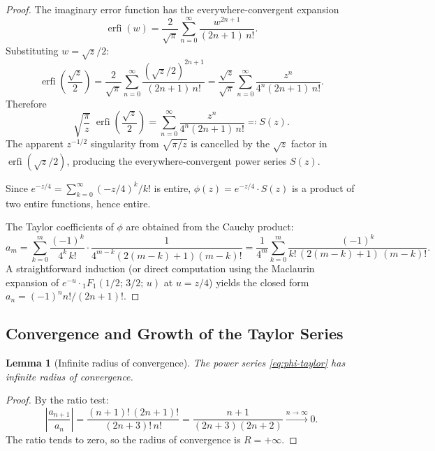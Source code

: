 \documentclass[11pt,a4paper]{article}
\newcommand{\erfi}{\operatorname{erfi}}
\theoremstyle{plain}
\newtheorem{lemma}[theorem]{Lemma}
\theoremstyle{definition}
\begin{document}
\begin{proof}
The imaginary error function has the everywhere-convergent expansion
\begin{equation}\label{eq:erfi-series}
  \erfi(w) = \frac{2}{\sqrt{\pi}}\sum_{n=0}^{\infty}
  \frac{w^{2n+1}}{(2n+1)\,n!}.
\end{equation}
Substituting $w = \sqrt{z}/2$:
\begin{equation}
  \erfi\!\left(\frac{\sqrt{z}}{2}\right)
  = \frac{2}{\sqrt{\pi}}\sum_{n=0}^{\infty}
  \frac{(\sqrt{z}/2)^{2n+1}}{(2n+1)\,n!}
  = \frac{\sqrt{z}}{\sqrt{\pi}}\sum_{n=0}^{\infty}
  \frac{z^n}{4^n(2n+1)\,n!}.
\end{equation}
Therefore
\begin{equation}\label{eq:sqrt-cancel}
  \sqrt{\frac{\pi}{z}}\;\erfi\!\left(\frac{\sqrt{z}}{2}\right)
  = \sum_{n=0}^{\infty} \frac{z^n}{4^n(2n+1)\,n!}
  \eqqcolon S(z).
\end{equation}
The apparent $z^{-1/2}$ singularity from $\sqrt{\pi/z}$ is cancelled
by the $\sqrt{z}$ factor in $\erfi(\sqrt{z}/2)$, producing the
everywhere-convergent power series $S(z)$.

Since $e^{-z/4} = \sum_{k=0}^{\infty} (-z/4)^k/k!$ is entire,
$\phi(z) = e^{-z/4}\cdot S(z)$ is a product of two entire functions,
hence entire.

The Taylor coefficients of $\phi$ are obtained from the Cauchy product:
\begin{equation}
  a_m = \sum_{k=0}^{m} \frac{(-1)^k}{4^k\, k!}\cdot
  \frac{1}{4^{m-k}(2(m-k)+1)(m-k)!}
  = \frac{1}{4^m}\sum_{k=0}^{m}
  \frac{(-1)^k}{k!\,(2(m-k)+1)\,(m-k)!}.
\end{equation}
A straightforward induction (or direct computation using the
Maclaurin expansion of $e^{-u}\cdot{}_1F_1(1/2;\,3/2;\,u)$
at $u = z/4$) yields the closed form $a_n = (-1)^n n!/(2n+1)!$.
\end{proof}

\subsection{Convergence and Growth of the Taylor Series}

\begin{lemma}[Infinite radius of convergence]\label{lem:convergence}
The power series \cref{eq:phi-taylor} has infinite radius of convergence.
\end{lemma}

\begin{proof}
By the ratio test:
\begin{equation}
  \left|\frac{a_{n+1}}{a_n}\right|
  = \frac{(n+1)!\,(2n+1)!}{(2n+3)!\,n!}
  = \frac{n+1}{(2n+3)(2n+2)}
  \xrightarrow{n\to\infty} 0.
\end{equation}
The ratio tends to zero, so the radius of convergence is $R = +\infty$.
\end{proof}
\end{document}

